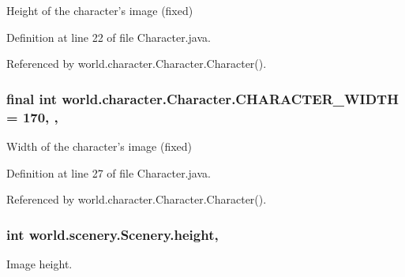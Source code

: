 Height of the character's image (fixed) 



Definition at line 22 of file Character.\-java.



Referenced by world.\-character.\-Character.\-Character().

\hypertarget{classworld_1_1character_1_1_character_a2a46ba03b3e10896b7757f891336e8b8}{
\subsubsection[{C\-H\-A\-R\-A\-C\-T\-E\-R\-\_\-\-W\-I\-D\-T\-H}]{\setlength{\rightskip}{0pt plus 5cm}final int world.\-character.\-Character.\-C\-H\-A\-R\-A\-C\-T\-E\-R\-\_\-\-W\-I\-D\-T\-H = 170\hspace{0.3cm}{\ttfamily [static]}, {\ttfamily [protected]}, {\ttfamily [inherited]}}}\label{classworld_1_1character_1_1_character_a2a46ba03b3e10896b7757f891336e8b8}


Width of the character's image (fixed) 



Definition at line 27 of file Character.\-java.



Referenced by world.\-character.\-Character.\-Character().

\hypertarget{classworld_1_1scenery_1_1_scenery_a54b4edfa060087e78a829105bf62a900}{
\subsubsection[{height}]{\setlength{\rightskip}{0pt plus 5cm}int world.\-scenery.\-Scenery.\-height\hspace{0.3cm}{\ttfamily [protected]}, {\ttfamily [inherited]}}}\label{classworld_1_1scenery_1_1_scenery_a54b4edfa060087e78a829105bf62a900}


Image height. 



